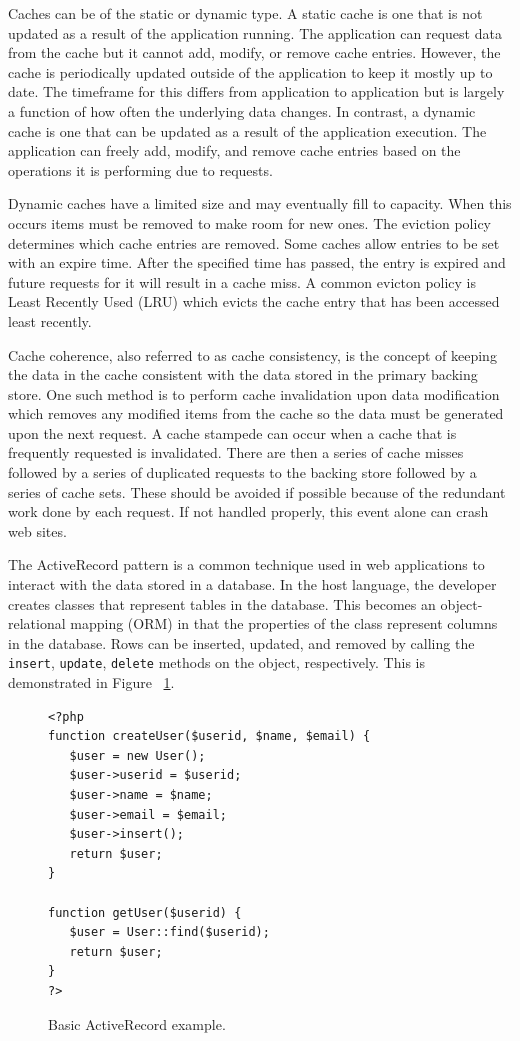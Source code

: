 \documentclass[12pt]{ucthesis}
\begin{document}
Caches can be of the static or dynamic type.
A static cache is one that is not updated as a result of the application running.
The application can request data from the cache but it cannot add, modify, or remove cache entries.
However, the cache is periodically updated outside of the application to keep it mostly up to date.
The timeframe for this differs from application to application but is largely a function of how often the underlying data changes.
In contrast, a dynamic cache is one that can be updated as a result of the application execution.
The application can freely add, modify, and remove cache entries based on the operations it is performing due to requests.

Dynamic caches have a limited size and may eventually fill to capacity.
When this occurs items must be removed to make room for new ones.
The eviction policy determines which cache entries are removed.
Some caches allow entries to be set with an expire time.
After the specified time has passed, the entry is expired and future requests for it will result in a cache miss.
A common evicton policy is Least Recently Used (LRU) which evicts the cache entry that has been accessed least recently.

Cache coherence, also referred to as cache consistency, is the concept of keeping the data in the cache consistent with the data stored in the primary backing store.
One such method is to perform cache invalidation upon data modification which removes any modified items from the cache so the data must be generated upon the next request.
A cache stampede can occur when a cache that is frequently requested is invalidated.
There are then a series of cache misses followed by a series of duplicated requests to the backing store followed by a series of cache sets.
These should be avoided if possible because of the redundant work done by each request.
If not handled properly, this event alone can crash web sites.

The ActiveRecord pattern is a common technique used in web applications to interact with the data stored in a database.
In the host language, the developer creates classes that represent tables in the database.
This becomes an object-relational mapping (ORM) in that the properties of the class represent columns in the database.
Rows can be inserted, updated, and removed by calling the {\tt insert}, {\tt update}, {\tt delete} methods on the object, respectively.
This is demonstrated in Figure ~\ref{fig:activeRecordExample}.

\begin{figure}[h]
\begin{ssp}
\begin{verbatim}
<?php
function createUser($userid, $name, $email) {
   $user = new User();
   $user->userid = $userid;
   $user->name = $name;
   $user->email = $email;
   $user->insert();
   return $user;
}

function getUser($userid) {
   $user = User::find($userid);
   return $user;
}
?>
\end{verbatim}
\end{ssp}
\caption{Basic ActiveRecord example.}
\label{fig:activeRecordExample}
\end{figure}
\end{document}
